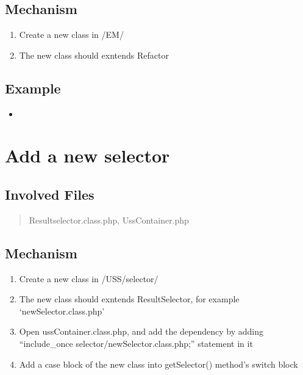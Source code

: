 \documentclass[letterpaper,10pt,english]{sphinxmanual}
\begin{document}
\subsection{Mechanism}
\label{docs/hooks/new_refactor:mechanism}\begin{enumerate}
\item {} 
Create a new class in /EM/

\item {} 
The new class should exntends Refactor

\end{enumerate}


\subsection{Example}
\label{docs/hooks/new_refactor:example}\begin{itemize}
\item {} 
{\hyperref[docs/api:ReplaceUri]{}}

\end{itemize}


\section{Add a new selector}
\label{docs/hooks/new_selector:hook-selector}\label{docs/hooks/new_selector::doc}\label{docs/hooks/new_selector:add-a-new-selector}

\subsection{Involved Files}
\label{docs/hooks/new_selector:involved-files}\begin{quote}

Resultselector.class.php, UssContainer.php
\end{quote}


\subsection{Mechanism}
\label{docs/hooks/new_selector:mechanism}\begin{enumerate}
\item {} 
Create a new class in /USS/selector/

\item {} 
The new class should exntends ResultSelector, for example `newSelector.class.php'

\item {} 
Open ussContainer.class.php, and add the dependency by adding ``include\_once selector/newSelector.class.php;'' statement in it

\item {} 
Add a case block of the new class into getSelector() method's switch block

\end{enumerate}
\end{document}
